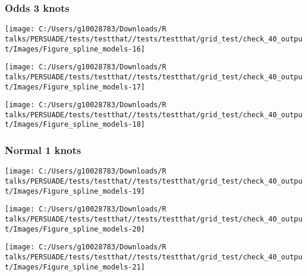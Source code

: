 \documentclass[
]{article}
\begin{document}
\clearpage

\subsubsection{Odds 3 knots}\label{odds-3-knots}

\begin{flushleft}\texttt{[image: C:/Users/g10028783/Downloads/R talks/PERSUADE/tests/testthat//tests/testthat/grid\_test/check\_40\_output/Images/Figure\_spline\_models-16]} \end{flushleft}

\begin{flushleft}\texttt{[image: C:/Users/g10028783/Downloads/R talks/PERSUADE/tests/testthat//tests/testthat/grid\_test/check\_40\_output/Images/Figure\_spline\_models-17]} \end{flushleft}

\begin{flushleft}\texttt{[image: C:/Users/g10028783/Downloads/R talks/PERSUADE/tests/testthat//tests/testthat/grid\_test/check\_40\_output/Images/Figure\_spline\_models-18]} \end{flushleft}

\clearpage

\subsubsection{Normal 1 knots}\label{normal-1-knots}

\begin{flushleft}\texttt{[image: C:/Users/g10028783/Downloads/R talks/PERSUADE/tests/testthat//tests/testthat/grid\_test/check\_40\_output/Images/Figure\_spline\_models-19]} \end{flushleft}

\begin{flushleft}\texttt{[image: C:/Users/g10028783/Downloads/R talks/PERSUADE/tests/testthat//tests/testthat/grid\_test/check\_40\_output/Images/Figure\_spline\_models-20]} \end{flushleft}

\begin{flushleft}\texttt{[image: C:/Users/g10028783/Downloads/R talks/PERSUADE/tests/testthat//tests/testthat/grid\_test/check\_40\_output/Images/Figure\_spline\_models-21]} \end{flushleft}

\clearpage
\end{document}
